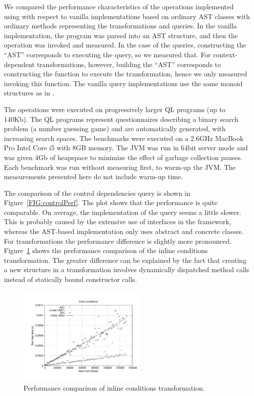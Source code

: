 We compared the performance characteristics of the operations implemented using \name with respect to vanilla implementations based on ordinary AST classes with ordinary methods representing the transformations and queries.
In the vanilla implementation, the program was parsed into an AST structure, and then the operation was invoked and measured.
In the case of the \name queries, constructing the ``AST'' corresponds to executing the query, so we measured that.
For context-dependent transformations, however, building the ``AST'' corresponds to constructing the function to execute the transformation, hence we only measured invoking this function.
The vanilla query implementations use the same monoid structures as in \name.

The operations were executed on progressively larger QL programs (up to 140Kb). The QL programs represent questionnaires describing a binary search problem (a number guessing game) and are automatically generated, with increasing search spaces. The benchmarks were executed on a 2.6GHz MacBook Pro Intel Core i5 with 8GB memory. The JVM was run in 64bit server mode and was given 4Gb of heapspace to minimize the effect of garbage collection pauses. Each benchmark was run without measuring first,  to warm-up the JVM. The measurements presented here do not include warm-up time.

The comparison of the control dependencies query is shown in Figure~\ref{FIG:controlPerf}.
The plot shows that the performance is quite comparable.
On average, the \name implementation of the query seems a little slower.
This is probably caused by the extensive use of interfaces in the \name framework, whereas the AST-based implementation only uses abstract and concrete classes.
For transformations the performance difference is slightly more pronounced.
Figure~\ref{FIG:inlinePerf} shows the performance comparison of the inline conditions transformation.
The greater difference can be explained by the fact that creating a new structure in a \name transformation involves dynamically dispatched method calls instead of statically bound constructor calls.

\begin{figure}[t]
  \nocaptionrule
  \hspace*{-.05\textwidth}
  \includegraphics[width=0.56\textwidth]{plots/inline}
  \caption{Performance comparison of inline conditions transformation.\label{FIG:inlinePerf}}
\end{figure}



